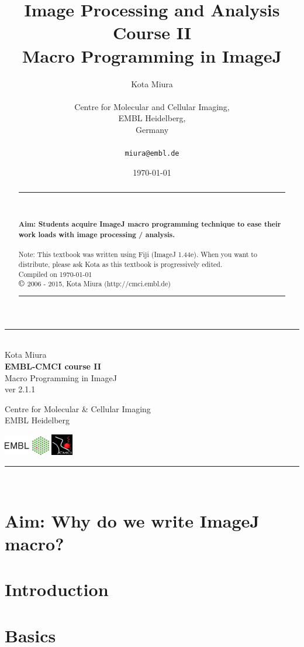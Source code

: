 \documentclass[11pt,a4paper,oneside]{report}
\newcommand{\HRule}{\rule{\linewidth}{0.5mm}}
\newcommand*{\titleTH}{\begingroup%
\raggedleft
\HRule\\
\vspace*{\baselineskip}
{\Large Kota Miura}\\[0.167\textheight]

{\bfseries EMBL-CMCI course II}\\[\baselineskip]
{\textcolor{Medium}{\Huge Macro Programming in ImageJ}}\\[\baselineskip]
{\small ver 2.1.1}\\
{\small \Revision}\par
\vfill

{\Large Centre for Molecular \& Cellular Imaging\\EMBL Heidelberg}\par
\includegraphics[width=0.15\textwidth]{fig/rgb_logo_2006_win.eps} 
\includegraphics[width=0.07\textwidth]{fig/Icon30pedge.jpg}\\[1cm] 
\vspace*{3\baselineskip}
\HRule\\
\endgroup}
\begin{document}
\title{Image Processing and Analysis Course II\\
Macro Programming in ImageJ}
\author{Kota Miura\\
\\
  Centre for Molecular and Cellular Imaging,\\
  EMBL Heidelberg,\\
  Germany\\
\\
\texttt{miura@embl.de}
}

\date{\today}

\pagestyle{empty}
\titleTH
\clearpage
\pagestyle{fancyplain}
\begin{abstract}
\HRule
\\
\\
\textbf{Aim: Students acquire ImageJ macro programming technique 
to ease their work loads with image processing / analysis.}
\\
\\
Note: This textbook was written using Fiji (ImageJ 1.44e). 
When you want to distribute, please ask Kota as this textbook is progressively edited.
\\
Compiled on \today \\
$\copyright$ 2006 - 2015, Kota Miura (http://cmci.embl.de)
\\
\HRule
\end{abstract}

\begingroup
\hypersetup{linkcolor=black}
\tableofcontents
\endgroup

\clearpage
\setcounter{chapter}{2}

%
\section{Aim: Why do we write ImageJ macro?}
  

\section{Introduction}
  

\section{Basics}
\label{sec:ImageJMacroBasics}
\end{document}
